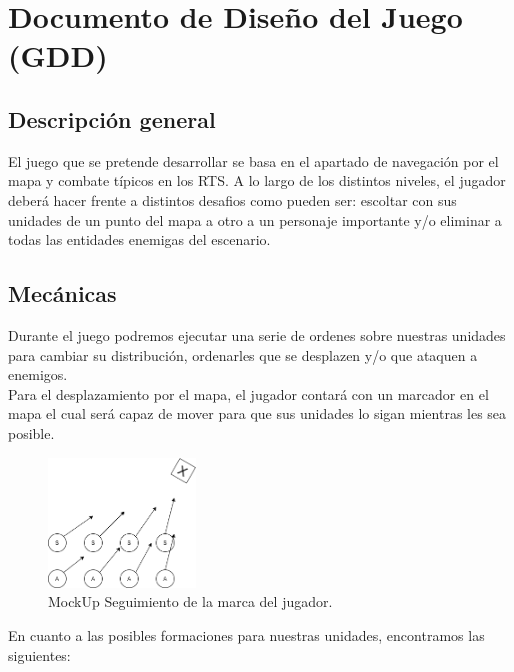 \chapter{Documento de Diseño del Juego (GDD)}
\label{GDD}

\section{Descripción general}
El juego que se pretende desarrollar se basa en el apartado de navegación por el mapa y combate
típicos en los \ac{RTS}. A lo largo de los distintos niveles, el jugador deberá hacer
frente a distintos desafios como pueden ser: escoltar con sus unidades de un punto
del mapa a otro a un personaje importante y/o eliminar a todas las entidades enemigas del escenario.

\section{Mecánicas}
Durante el juego podremos ejecutar una serie de ordenes sobre nuestras unidades para cambiar
su distribución, ordenarles que se desplazen y/o que ataquen a enemigos.\\
Para el desplazamiento por el mapa, el jugador contará con un marcador en el mapa el cual
será capaz de mover para que sus unidades lo sigan mientras les sea posible.

\begin{figure}[ht]
\centering
\includegraphics[width=0.35\textwidth]{imagenes/gdd/Following.png}
\caption{MockUp Seguimiento de la marca del jugador.}
\label{fig:mockup_following}
\end{figure}

En cuanto a las posibles formaciones para nuestras unidades, encontramos las siguientes:

\newpage

